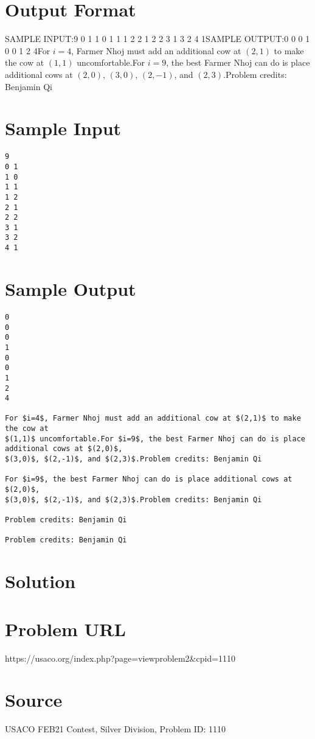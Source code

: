\documentclass[12pt]{article}
\begin{document}
\section*{Output Format}
SAMPLE INPUT:9
0 1
1 0
1 1
1 2
2 1
2 2
3 1
3 2
4 1SAMPLE OUTPUT:0
0
0
1
0
0
1
2
4For $i=4$, Farmer Nhoj must add an additional cow at $(2,1)$ to make the cow at
$(1,1)$ uncomfortable.For $i=9$, the best Farmer Nhoj can do is place additional cows at $(2,0)$,
$(3,0)$, $(2,-1)$, and $(2,3)$.Problem credits: Benjamin Qi

\section*{Sample Input}
\begin{verbatim}
9
0 1
1 0
1 1
1 2
2 1
2 2
3 1
3 2
4 1
\end{verbatim}

\section*{Sample Output}
\begin{verbatim}
0
0
0
1
0
0
1
2
4

For $i=4$, Farmer Nhoj must add an additional cow at $(2,1)$ to make the cow at
$(1,1)$ uncomfortable.For $i=9$, the best Farmer Nhoj can do is place additional cows at $(2,0)$,
$(3,0)$, $(2,-1)$, and $(2,3)$.Problem credits: Benjamin Qi

For $i=9$, the best Farmer Nhoj can do is place additional cows at $(2,0)$,
$(3,0)$, $(2,-1)$, and $(2,3)$.Problem credits: Benjamin Qi

Problem credits: Benjamin Qi

Problem credits: Benjamin Qi
\end{verbatim}

\section*{Solution}


\section*{Problem URL}
https://usaco.org/index.php?page=viewproblem2&cpid=1110

\section*{Source}
USACO FEB21 Contest, Silver Division, Problem ID: 1110
\end{document}
